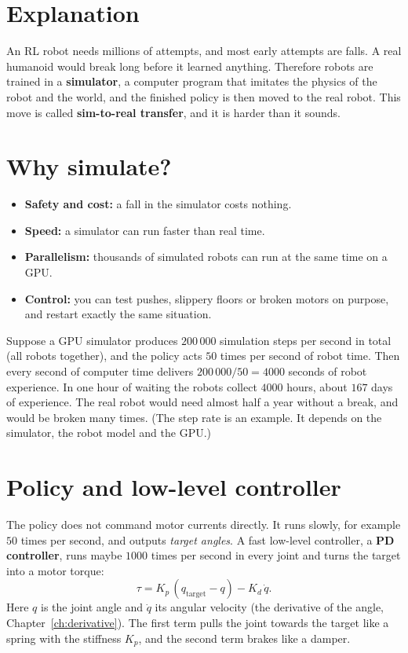 \label{ch:rl6}

\section*{Explanation}
An RL robot needs millions of attempts, and most early attempts are falls. A real humanoid would break long before it learned anything. Therefore robots are trained in a \textbf{simulator}, a computer program that imitates the physics of the robot and the world, and the finished policy is then moved to the real robot. This move is called \textbf{sim-to-real transfer}, and it is harder than it sounds.

\section*{Why simulate?}
\begin{itemize}[nosep]
  \item \textbf{Safety and cost:} a fall in the simulator costs nothing.
  \item \textbf{Speed:} a simulator can run faster than real time.
  \item \textbf{Parallelism:} thousands of simulated robots can run at the same time on a GPU.
  \item \textbf{Control:} you can test pushes, slippery floors or broken motors on purpose, and restart exactly the same situation.
\end{itemize}

\begin{example}
Suppose a GPU simulator produces $200\,000$ simulation steps per second in total (all robots together), and the policy acts $50$ times per second of robot time. Then every second of computer time delivers $200\,000/50=4000$ seconds of robot experience. In one hour of waiting the robots collect $4000$ hours, about $167$ days of experience. The real robot would need almost half a year without a break, and would be broken many times. (The step rate is an example. It depends on the simulator, the robot model and the GPU.)
\end{example}

\section*{Policy and low-level controller}
The policy does not command motor currents directly. It runs slowly, for example $50$ times per second, and outputs \emph{target angles}. A fast low-level controller, a \textbf{PD controller}, runs maybe $1000$ times per second in every joint and turns the target into a motor torque:
\[
\tau=K_p\,(q_{\text{target}}-q)-K_d\,\dot q .
\]
Here $q$ is the joint angle and $\dot q$ its angular velocity (the derivative of the angle, Chapter~\ref{ch:derivative}). The first term pulls the joint towards the target like a spring with the stiffness $K_p$, and the second term brakes like a damper.

